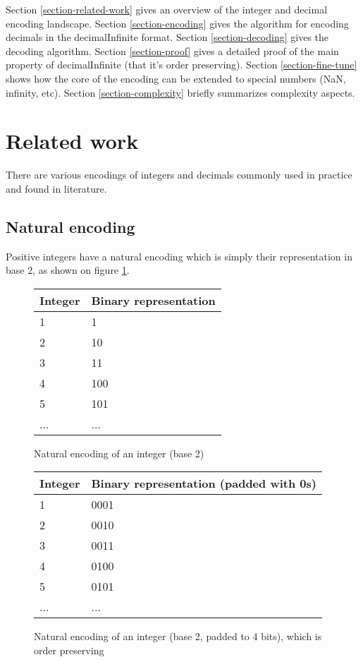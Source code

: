 \documentclass{acm_proc_article-sp}
\begin{document}
Section \ref{section-related-work} gives an overview of the integer and decimal encoding landscape.
Section \ref{section-encoding} gives the algorithm for encoding decimals in the decimalInfinite format.
Section \ref{section-decoding} gives the decoding algorithm.
Section \ref{section-proof} gives a detailed proof of the main property of decimalInfinite (that it's order preserving).
Section \ref{section-fine-tune} shows how the core of the encoding can be extended to special numbers (NaN, infinity, etc).
Section \ref{section-complexity} briefly summarizes complexity aspects.

\section{Related work}

There are various encodings of integers and decimals commonly used in practice and found in literature.

\label{section-related-work}

\subsection{Natural encoding}

Positive integers have a natural encoding which is simply their representation in base 2, as shown on figure \ref{figure-natural-encoding}.

\begin{figure}
\caption{Natural encoding of an integer (base 2)}
\label{figure-natural-encoding}
\center
\begin{tabular}{|l|l|}
\hline
Integer & Binary representation \\
\hline
1 & 1 \\
\hline
2 & 10 \\
\hline
3 & 11 \\
\hline
4 & 100  \\
\hline
5 & 101  \\
\hline
... & ... \\
\hline
\end{tabular}
\end{figure}

\begin{figure}
\caption{Natural encoding of an integer (base 2, padded to 4 bits), which is order preserving}
\label{figure-natural-encoding-padded}
\center
\begin{tabular}{|l|l|}
\hline
Integer & Binary representation (padded with 0s) \\
\hline
1 & 0001 \\
\hline
2 & 0010 \\
\hline
3 & 0011 \\
\hline
4 & 0100 \\
\hline
5 & 0101 \\
\hline
... & ... \\
\hline
\end{tabular}
\end{figure}
\end{document}
